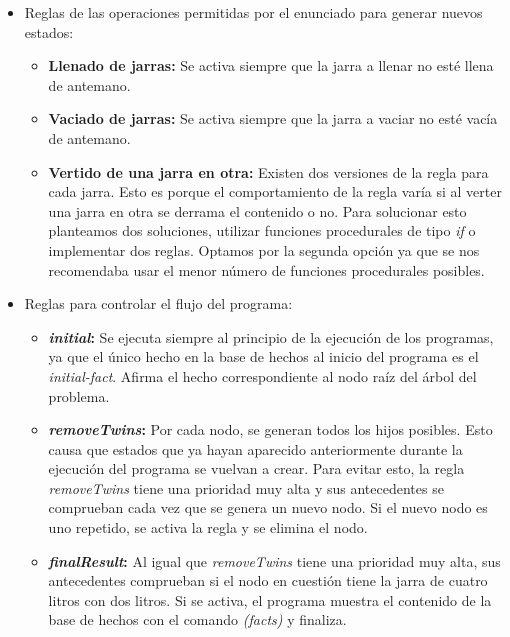 \documentclass[11pt,a4paper,final]{article}
\begin{document}
\begin{itemize}
	\item Reglas de las operaciones permitidas por el enunciado para generar nuevos estados:
	
	\begin{itemize}
		\item \textbf{Llenado de jarras:} Se activa siempre que la jarra a llenar no esté llena de antemano.
		\item \textbf{Vaciado de jarras:} Se activa siempre que la jarra a vaciar no esté vacía de antemano.
		\item \textbf{Vertido de una jarra en otra:} Existen dos versiones de la regla para cada jarra. Esto es porque  el comportamiento de la regla varía si al verter una jarra en otra se derrama el contenido o no. Para solucionar esto planteamos dos soluciones, utilizar funciones procedurales de tipo \emph{if} o implementar dos reglas. Optamos por la segunda opción ya que se nos recomendaba usar el menor número de funciones procedurales posibles.
	\end{itemize}
	
	\item Reglas para controlar el flujo del programa:
	
	\begin{itemize}
		\item \textbf{\emph{initial}:} Se ejecuta siempre al principio de la ejecución de los programas, ya que el único hecho en la base de hechos al inicio del programa es el \emph{initial-fact}. Afirma el hecho correspondiente al nodo raíz del árbol del problema.
		\item \textbf{\emph{removeTwins}:} Por cada nodo, se generan todos los hijos posibles. Esto causa que estados que ya hayan aparecido anteriormente durante la ejecución del programa se vuelvan a crear. Para evitar esto, la regla \emph{removeTwins} tiene una prioridad muy alta y sus antecedentes se comprueban cada vez que se genera un nuevo nodo. Si el nuevo nodo es uno repetido, se activa la regla y se elimina el nodo.
		\item \textbf{\emph{finalResult}:} Al igual que \emph{removeTwins} tiene una prioridad muy alta, sus antecedentes comprueban si el nodo en cuestión tiene la jarra de cuatro litros con dos litros. Si se activa, el programa muestra el contenido de la base de hechos con el comando \emph{(facts)} y finaliza.
	\end{itemize}
\end{itemize}
\end{document}
